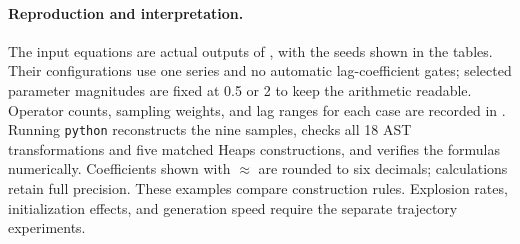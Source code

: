 \paragraph{Reproduction and interpretation.}
The input equations are actual outputs of
, with the seeds shown in the
tables. Their configurations use one series and no automatic
lag-coefficient gates; selected parameter magnitudes are fixed at 0.5 or 2 to
keep the arithmetic readable. Operator counts, sampling weights, and lag ranges
for each case are recorded in .
Running \texttt{python}  reconstructs the
nine samples, checks all 18 AST transformations and five matched Heaps
constructions, and verifies the formulas numerically. Coefficients shown with
$\approx$ are rounded to six decimals; calculations retain full precision.
These examples compare construction rules. Explosion rates, initialization
effects, and generation speed require the separate trajectory experiments.

